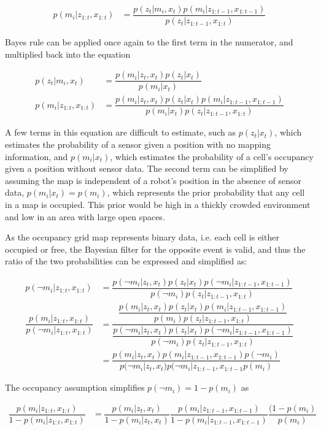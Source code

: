\begin{align}
    p(m_i|z_{1:t},x_{1:t}) &= \dfrac{p(z_t|m_i,x_t) p(m_i|z_{1:t-1},x_{1:t-1 })}{p(z_t|z_{1:t-1},x_{1:t})}
\end{align}

Bayes rule can be applied once again to the first term in the numerator, and multiplied back into the equation
 
\begin{align}
    p(z_t|m_i,x_t) &= \dfrac{p(m_i|z_t,x_t)p(z_t|x_t)}{p(m_i|x_t)} \\
    p(m_i|z_{1:t},x_{1:t}) &= \dfrac{p(m_i|z_t,x_t)p(z_t|x_t) p(m_i|z_{1:t-1},x_{1:t-1 })}{p(m_i|x_t)p(z_t|z_{1:t-1},x_{1:t})}
\end{align}

A few terms in this equation are difficult to estimate, such as $p(z_t|x_t)$, which estimates the probability of a sensor given a position with no mapping information, and $p(m_i|x_t)$, which estimates the probability of a cell's occupancy given a position without sensor data. The second term can be simplified by assuming the map is independent of a robot's position in the absence of sensor data, $p(m_i|x_t) = p(m_i)$, which represents the prior probability that any cell in a map is occupied. This prior would be high in a thickly crowded environment and low in an area with large open spaces.

As the occupancy grid map represents binary data, i.e. each cell is either occupied or free, the Bayesian filter for the opposite event is valid, and thus the ratio of the two probabilities can be expressed and simplified as:

\begin{align}
    p(\neg m_i|z_{1:t},x_{1:t}) &= \dfrac{p(\neg m_i|z_t,x_t)p(z_t|x_t) p(\neg m_i|z_{1:t-1},x_{1:t-1 })}{p(\neg m_i)p(z_t|z_{1:t-1},x_{1:t})} \\
    \dfrac{p(m_i|z_{1:t},x_{1:t})}{p(\neg m_i|z_{1:t},x_{1:t})} &= \dfrac{\dfrac{p(m_i|z_t,x_t)p(z_t|x_t)     p(m_i|z_{1:t-1},x_{1:t-1 })}{p(m_i)p(z_t|z_{1:t-1},x_{1:t})}}{\dfrac{p(\neg m_i|z_t,x_t)p(z_t|x_t) p(\neg m_i|z_{1:t-1},x_{1:t-1 })}{p(\neg m_i)p(z_t|z_{1:t-1},x_{1:t})}} \\
    &= \dfrac{p(m_i|z_t,x_t) p(m_i|z_{1:t-1},x_{1:t-1})p(\neg m_i)}{p(\neg m_i|z_t,x_t) p(\neg m_i|z_{1:t-1},x_{1:t-1}p(m_i)}
\end{align}

The occupancy assumption simplifies $p(\neg m_i) = 1 - p(m_i)$ as

\begin{align}
    \dfrac{p(m_i|z_{1:t},x_{1:t})}{1 - p(m_i|z_{1:t},x_{1:t})} &= \dfrac{p(m_i|z_t,x_t)}{1 - p(m_i|z_t,x_t)} \dfrac{p(m_i|z_{1:t-1},x_{1:t-1})}{1 - p(m_i|z_{1:t-1},x_{1:t-1})} \dfrac{(1 - p(m_i)}{p(m_i)}
    \label{eq:map_ratio_bayes}
\end{align}

